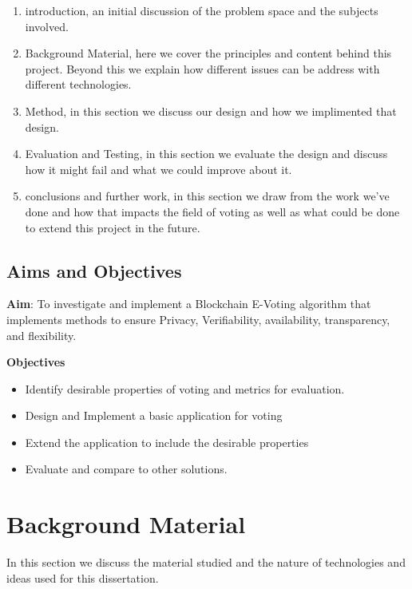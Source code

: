 \documentclass{entcs}
\begin{document}
\begin{enumerate}
    \item introduction, an initial discussion of the problem space and the subjects involved.
    \item Background Material, here we cover the principles and content behind this project. Beyond this we explain how different issues can be address with different technologies.
    \item Method, in this section we discuss our design and how we implimented that design.
    \item Evaluation and Testing, in this section we evaluate the design and discuss how it might fail and what we could improve about it.
    \item conclusions and further work, in this section we draw from the work we've done and how that impacts the field of voting as well as what could be done to extend this project in the future.
\end{enumerate}

\subsection{Aims and Objectives}
\begin{center}
    {\bf Aim}: To investigate and implement a Blockchain E-Voting algorithm that implements methods to ensure Privacy, Verifiability, availability, transparency, and flexibility. 
\end{center}
{\bf Objectives}
\begin{itemize}
    \item Identify desirable properties of voting and metrics for evaluation.
    \item Design and Implement a basic application for voting
    \item Extend the application to include the desirable properties
    \item Evaluate and compare to other solutions.
\end{itemize}

\section{Background Material}
In this section we discuss the material studied and the nature of technologies and ideas used for this dissertation.
\end{document}
